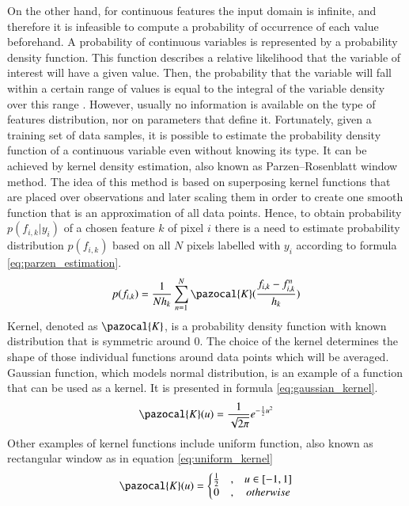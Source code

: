 On the other hand, for continuous features the input domain is infinite, and therefore it is infeasible to compute a probability of occurrence of each value beforehand. A probability of continuous variables is represented by a probability density function. This function describes a relative likelihood that the variable of interest will have a given value. Then, the probability that the variable will fall within a certain range of values is equal to the integral of the variable density over this range \cite{statistics}. However, usually no information is available on the type of features distribution, nor on parameters that define it. Fortunately, given a training set of data samples, it is possible to estimate the probability density function of a continuous variable even without knowing its type. It can be achieved by kernel density estimation, also known as Parzen–Rosenblatt window method. The idea of this method is based on superposing kernel functions that are placed over observations and later scaling them in order to create one smooth function that is an approximation of all data points. Hence, to obtain probability $p(f_{i,k}|y_i)$ of a chosen feature $k$ of pixel $i$ there is a need to estimate probability distribution $p(f_{i,k})$ based on all $N$ pixels labelled with $y_i$ according to formula \ref{eq:parzen_estimation}.
\begin{equation}
    \label{eq:parzen_estimation}
    p(f_{i,k}) = \frac{1}{Nh_k} \sum_{n=1}^{N} \pazocal{K} (\frac{f_{i,k} - f_{i,k}^{n}}{h_k})
\end{equation}
Kernel, denoted as $\pazocal{K}$, is a probability density function with known distribution that is symmetric around 0. The choice of the kernel determines the shape of those individual functions around data points which will be averaged. Gaussian function, which models normal distribution, is an example of a function that can be used as a kernel. It is presented in formula \ref{eq:gaussian_kernel}.
\begin{equation}
    \label{eq:gaussian_kernel}
    \pazocal{K}(u) = \frac{1}{\sqrt{2\pi}}e^{-\frac{1}{2}u^2}
\end{equation}
Other examples of kernel functions include uniform function, also known as rectangular window as in equation \ref{eq:uniform_kernel}
\begin{equation}
    \label{eq:uniform_kernel}
    \pazocal{K}(u) =  \left\{\begin{matrix}
         \frac{1}{2} & , & u \in \left [ -1,1 \right ] \\
        0 & , & otherwise
        \end{matrix}\right.
\end{equation}
